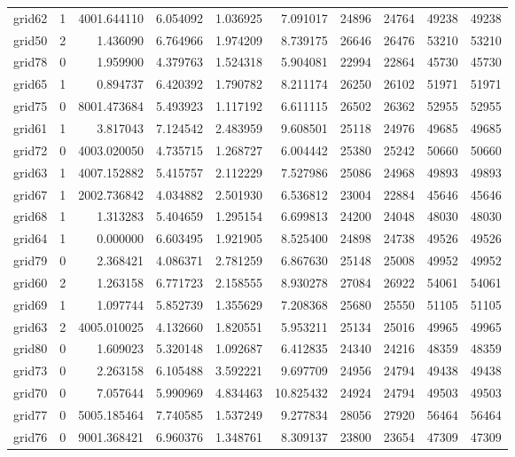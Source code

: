 \begin{longtable}{|l|r|r|r|r|r|r|r|r|r|}
grid62 & 1 & 4001.644110 & 6.054092 & 1.036925 & 7.091017 & 24896 & 24764 & 49238 & 49238 \\
grid50 & 2 & 1.436090 & 6.764966 & 1.974209 & 8.739175 & 26646 & 26476 & 53210 & 53210 \\
grid78 & 0 & 1.959900 & 4.379763 & 1.524318 & 5.904081 & 22994 & 22864 & 45730 & 45730 \\
grid65 & 1 & 0.894737 & 6.420392 & 1.790782 & 8.211174 & 26250 & 26102 & 51971 & 51971 \\
grid75 & 0 & 8001.473684 & 5.493923 & 1.117192 & 6.611115 & 26502 & 26362 & 52955 & 52955 \\
grid61 & 1 & 3.817043 & 7.124542 & 2.483959 & 9.608501 & 25118 & 24976 & 49685 & 49685 \\
grid72 & 0 & 4003.020050 & 4.735715 & 1.268727 & 6.004442 & 25380 & 25242 & 50660 & 50660 \\
grid63 & 1 & 4007.152882 & 5.415757 & 2.112229 & 7.527986 & 25086 & 24968 & 49893 & 49893 \\
grid67 & 1 & 2002.736842 & 4.034882 & 2.501930 & 6.536812 & 23004 & 22884 & 45646 & 45646 \\
grid68 & 1 & 1.313283 & 5.404659 & 1.295154 & 6.699813 & 24200 & 24048 & 48030 & 48030 \\
grid64 & 1 & 0.000000 & 6.603495 & 1.921905 & 8.525400 & 24898 & 24738 & 49526 & 49526 \\
grid79 & 0 & 2.368421 & 4.086371 & 2.781259 & 6.867630 & 25148 & 25008 & 49952 & 49952 \\
grid60 & 2 & 1.263158 & 6.771723 & 2.158555 & 8.930278 & 27084 & 26922 & 54061 & 54061 \\
grid69 & 1 & 1.097744 & 5.852739 & 1.355629 & 7.208368 & 25680 & 25550 & 51105 & 51105 \\
grid63 & 2 & 4005.010025 & 4.132660 & 1.820551 & 5.953211 & 25134 & 25016 & 49965 & 49965 \\
grid80 & 0 & 1.609023 & 5.320148 & 1.092687 & 6.412835 & 24340 & 24216 & 48359 & 48359 \\
grid73 & 0 & 2.263158 & 6.105488 & 3.592221 & 9.697709 & 24956 & 24794 & 49438 & 49438 \\
grid70 & 0 & 7.057644 & 5.990969 & 4.834463 & 10.825432 & 24924 & 24794 & 49503 & 49503 \\
grid77 & 0 & 5005.185464 & 7.740585 & 1.537249 & 9.277834 & 28056 & 27920 & 56464 & 56464 \\
grid76 & 0 & 9001.368421 & 6.960376 & 1.348761 & 8.309137 & 23800 & 23654 & 47309 & 47309 \\

\end{longtable}
